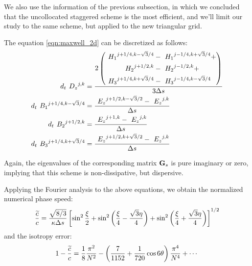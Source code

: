 We also use the information of the previous subsection, in which we
concluded that the uncollocated staggered scheme is the most efficient,
and we'll limit our study to the same scheme, but applied to the new
triangular grid.


The equation \eqref{eqn:maxwell_2d} can be discretized as follows:
\begin{equation} \label{eqn:hexagonal_grid} \begin{split}
    d_t {\ }^{}{D_z}^{j,k} & = \frac{2 \left( \begin{aligned}
	{\ }^{}{H_1}^{j+1/4,k-\sqrt{3}/4} & -
	{\ }^{}{H_1}^{j-1/4,k+\sqrt{3}/4} + \\
	{\ }^{}{H_2}^{j+1/2,k} & - {\ }^{}{H_2}^{j-1/2,k} + \\
	{\ }^{}{H_3}^{j+1/4,k+\sqrt{3}/4} & -
	{\ }^{}{H_3}^{j-1/4,k-\sqrt{3}/4}
    \end{aligned} \right)}{3 \Delta s} \\
    d_t {\ }^{}{B_1}^{j+1/4,k-\sqrt{3}/4} & =
    \frac{{\ }^{}{E_z}^{j+1/2,k-\sqrt{3}/2} - {\ }^{}{E_z}^{j,k}}{\Delta s} \\
    d_t {\ }^{}{B_2}^{j+1/2,k} & = \frac{{\ }^{}{E_z}^{j+1,k} -
    {\ }^{}{E_z}^{j,k}}{\Delta s} \\
    d_t {\ }^{}{B_3}^{j+1/4,k+\sqrt{3}/4} & =
    \frac{{\ }^{}{E_z}^{j+1/2,k+\sqrt{3}/2} - {\ }^{}{E_z}^{j,k}}{\Delta s}
\end{split} \end{equation}

Again, the eigenvalues of the corresponding matrix $\mathbf{G}_s$ is
pure imaginary or zero, implying that this scheme is non-dissipative,
but dispersive.

Applying the Fourier analysis to the above equations, we obtain the
normalized numerical phase speed:
\begin{equation}
  \frac{\widetilde{c}}{c} = \frac{\sqrt{8/3}}{\kappa \Delta s}\left[
  \sin^2 \frac{\xi}{2} + \sin^2 \left(\frac{\xi}{4} -
  \frac{\sqrt{3}\eta}{4}\right) + \sin^2 \left(\frac{\xi}{4} +
  \frac{\sqrt{3}\eta}{4}\right)\right]^{1/2}
\end{equation}
and the isotropy error:
\begin{equation}
  1-\frac{\widetilde{c}}{c} = \frac{1}{8}\frac{\pi^2}{N^2} -
  \left(\frac{7}{1152} + \frac{1}{720} \cos 6\theta\right) \frac{\pi^4}{N^4} +
  \dotsb
\end{equation}

